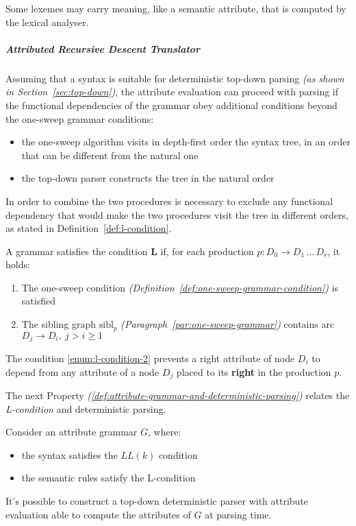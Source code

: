 \documentclass[english]{article}
\begin{document}
Some lexemes may carry meaning, like a semantic attribute, that is computed by the lexical analyser.

\subparagraph{Attributed Recursive Descent Translator}

Assuming that a syntax is suitable for deterministic top-down parsing \textit{(as shown in Section~\ref{sec:top-down})}, the attribute evaluation can proceed with parsing if the functional dependencies of the grammar obey additional conditions beyond the one-sweep grammar conditions:

\begin{itemize}
  \item the one-sweep algorithm visits in depth-first order the syntax tree, in an order that can be different from the natural one
  \item the top-down parser constructs the tree in the natural order
\end{itemize}

In order to combine the two procedures is necessary to exclude any functional dependency that would make the two procedures visit the tree in different orders, as stated in Definition~\ref{def:l-condition}.

\begin{definition}[L-condition]
  \label{def:l-condition}
  A grammar satisfies the condition \textbf{L} if, for each production \(p: D_0 \rightarrow D_1 \,\ldots\, D_r\), it holds:

  \begin{enumerate}[label=\alph*., ref=(\alph*)]
    \item\label{enum:l-condition-1} The one-sweep condition \textit{(Definition~\ref{def:one-sweep-grammar-condition})} is satisfied
    \item\label{enum:l-condition-2} The sibling graph \(\text{sibl}_p\) \textit{(Paragraph~\ref{par:one-sweep-grammar})} contains arc \(D_j \rightarrow D_i, \ j > i \geq 1\)
  \end{enumerate}
\end{definition}

The condition \ref{enum:l-condition-2} prevents a right attribute of node \(D_i\) to depend from any attribute of a node \(D_j\) placed to its \textbf{right} in the production \(p\).

\bigskip
The next Property \textit{(\ref{def:attribute-grammar-and-deterministic-parsing})} relates the \textit{L-condition} and deterministic parsing.

\begin{definition}
  \label{def:attribute-grammar-and-deterministic-parsing}
  Consider an attribute grammar \(G\), where:

  \begin{itemize}
    \item the syntax satisfies the \(LL(k)\) condition
    \item the semantic rules satisfy the L-condition
  \end{itemize}

  It's possible to construct a top-down deterministic parser with attribute evaluation able to compute the attributes of \(G\) at parsing time.
\end{definition}
\end{document}
